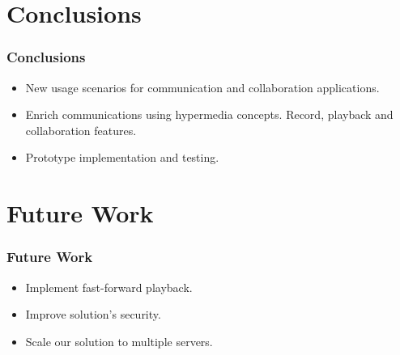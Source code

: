 \documentclass[compress]{beamer}
\begin{document}
\section{Conclusions}\label{concl} %

\begin{frame}[c]
		\frametitle{Conclusions}
		\begin{itemize}
\item New usage scenarios for communication and collaboration applications.
		\vfill

\item Enrich communications using hypermedia concepts. Record, playback and collaboration features.
		\vfill

\item Prototype implementation and testing.
		\end{itemize}

	\end{frame}


\section{Future Work}\label{concl} %

\begin{frame}[c]
		\frametitle{Future Work}
		\begin{itemize}
\item Implement fast-forward playback.
		\vfill

\item Improve solution's security.
		\vfill

\item Scale our solution to multiple servers.
		\end{itemize}

	\end{frame}





\end{document}
